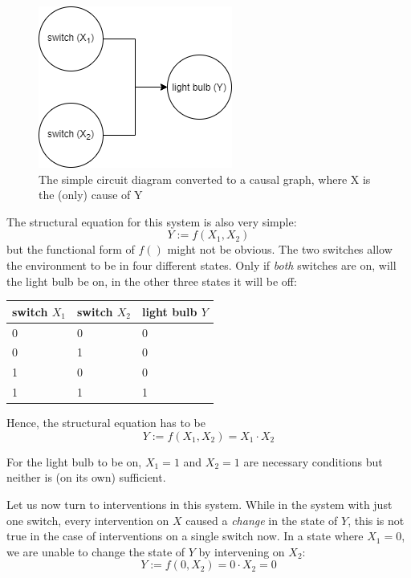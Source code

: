 \documentclass[
]{book}
\theoremstyle{definition}
\theoremstyle{definition}
\theoremstyle{definition}
\theoremstyle{remark}
\begin{document}
\begin{figure}
\centering
\includegraphics{images/causal_models-dag_simple_electric_2.png}
\caption{The simple circuit diagram converted to a causal graph, where X is the (only) cause of Y}
\end{figure}

The structural equation for this system is also very simple:
\begin{equation}
Y := f(X_1, X_2)
\end{equation}
but the functional form of \(f()\) might not be obvious. The two switches allow the environment to be in four different states. Only if \emph{both} switches are on, will the light bulb be on, in the other three states it will be off:

\begin{longtable}[]{@{}lll@{}}
\toprule
switch \(X_1\) & switch \(X_2\) & light bulb \(Y\)\tabularnewline
\midrule
\endhead
0 & 0 & 0\tabularnewline
0 & 1 & 0\tabularnewline
1 & 0 & 0\tabularnewline
1 & 1 & 1\tabularnewline
\bottomrule
\end{longtable}

Hence, the structural equation has to be
\begin{equation}
Y := f(X_1, X_2) = X_1 \cdot X_2
\end{equation}

For the light bulb to be on, \(X_1=1\) and \(X_2=1\) are necessary conditions but neither is (on its own) sufficient.

Let us now turn to interventions in this system. While in the system with just one switch, every intervention on \(X\) caused a \emph{change} in the state of \(Y\), this is not true in the case of interventions on a single switch now. In a state where \(X_1 = 0\), we are unable to change the state of \(Y\) by intervening on \(X_2\):
\begin{equation}
Y := f(0, X_2) = 0 \cdot X_2 = 0
\end{equation}
\end{document}
